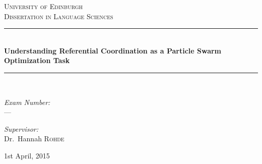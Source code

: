 \documentclass[12pt,a4paper]{article}
\newcommand{\HRule}{\rule{\linewidth}{0.5mm}}
\begin{document}
\begin{titlepage}

\begin{center}

\textsc{\LARGE University of Edinburgh}\\[1cm]

\textsc{\Large Dissertation in Language Sciences}\\[1.5cm]

\HRule \\[0.4cm]
{ \huge \bfseries Understanding Referential Coordination as a Particle Swarm Optimization Task \\[0.4cm] }

\HRule \\[1.5cm]


\noindent
\begin{minipage}{0.4\textwidth}
\begin{flushleft} \large
\emph{Exam Number:}\\
---
\end{flushleft}
\end{minipage}%
\begin{minipage}{0.4\textwidth}
\begin{flushright} \large
\emph{Supervisor:} \\
Dr.~Hannah \textsc{Rohde}
\end{flushright}
\end{minipage}

\vfill

{\large 1st April, 2015}


\end{center}
\end{titlepage}

\onehalfspace

\begin{abstract}
In ``Communicating with Cost-based Implicature: a Game-Theoretic Approach to Ambiguity" \citeyearpar{rohde2012}, \citeauthor{rohde2012} sought to investigate the effects of ambiguous and unambiguous form costs on referential coordination. To do so, \citeauthor{rohde2012} ran a number of experiments in which participants played an iterated referential coordination language game. This paper models their results using particle swarm optimization (PSO), a general-purpose optimization method for non-differentiable problems with continuous search spaces. Two PSO-based models are presented and shown to perform well against a baseline model; predictions from the more favourable of the two models for several variants of the \citeauthor{rohde2012} language games are also presented.
\end{abstract}
\end{document}
